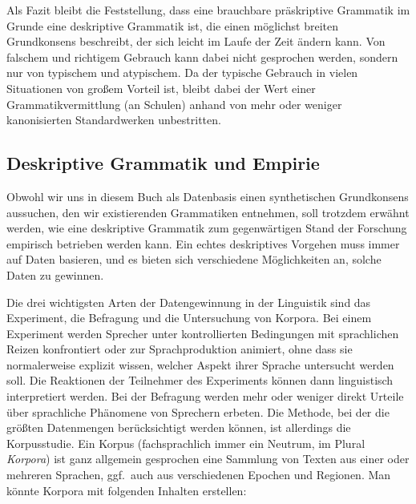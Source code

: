 Als Fazit bleibt die Feststellung, dass eine brauchbare präskriptive Grammatik im Grunde eine deskriptive Grammatik ist, die einen möglichst breiten Grundkonsens beschreibt, der sich leicht im Laufe der Zeit ändern kann.
Von falschem und richtigem Gebrauch kann dabei nicht gesprochen werden, sondern nur von typischem und atypischem.
Da der typische Gebrauch in vielen Situationen von großem Vorteil ist, bleibt dabei der Wert einer Grammatikvermittlung (\zB an Schulen) anhand von mehr oder weniger kanonisierten Standardwerken unbestritten.

\subsection{Deskriptive Grammatik und Empirie}

Obwohl wir uns in diesem Buch als Datenbasis einen synthetischen Grundkonsens aussuchen, den wir existierenden Grammatiken entnehmen, soll trotzdem erwähnt werden, wie eine deskriptive Grammatik zum gegenwärtigen Stand der Forschung empirisch betrieben werden kann.
Ein echtes deskriptives Vorgehen muss immer auf Daten basieren, und es bieten sich verschiedene Möglichkeiten an, solche Daten zu gewinnen.

Die drei wichtigsten Arten der Datengewinnung in der Linguistik sind das Experiment, die Befragung und die Untersuchung von Korpora.
Bei einem Experiment werden Sprecher unter kontrollierten Bedingungen mit sprachlichen Reizen konfrontiert oder zur Sprachproduktion animiert, ohne dass sie normalerweise explizit wissen, welcher Aspekt ihrer Sprache untersucht werden soll.
Die Reaktionen der Teilnehmer des Experiments können dann linguistisch interpretiert werden.
Bei der Befragung werden mehr oder weniger direkt Urteile über sprachliche Phänomene von Sprechern erbeten.
Die Methode, bei der die größten Datenmengen berücksichtigt werden können, ist allerdings die Korpusstudie.
Ein Korpus (fachsprachlich immer ein Neutrum, im Plural \textit{Korpora}) ist ganz allgemein gesprochen eine Sammlung von Texten aus einer oder mehreren Sprachen, ggf.\ auch aus verschiedenen Epochen und Regionen.
Man könnte \zB Korpora mit folgenden Inhalten erstellen:

